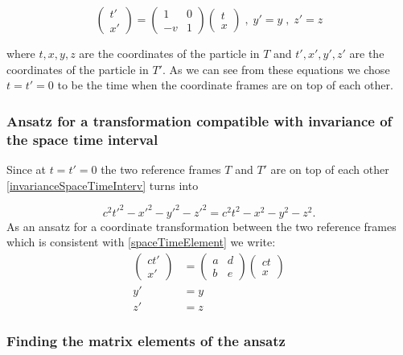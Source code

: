 \documentclass{article}
\begin{document}
\begin{equation} \label{Galilei}
\left(\begin{array}{c}
t'
\\
x'
\end{array} \right)
=
\begin{pmatrix}
1 & 0
\\
-v & 1
\end{pmatrix}
\left(\begin{array}{c}
t
\\
x
\end{array} \right)
\;,\; y'=y \;,\; z'=z
\end{equation}

where $t,x,y,z$ are the coordinates of the particle in $T$ and $t',x',y',z'$ are the coordinates of the particle in $T'$.
As we can see from these equations we chose $t=t'=0$ to be the time when the coordinate frames are on top of each other.

\subsubsection{Ansatz for a transformation compatible with invariance of the space time interval}

Since at $t=t'=0$ the two reference frames $T$ and $T'$ are on top of each other \ref{invarianceSpaceTimeInterv} turns into

\begin{equation} \label{spaceTimeElement}
c^2t'^2-x'^2-y'^2-z'^2 = c^2t^2-x^2-y^2-z^2.
\end{equation}
As an ansatz for a coordinate transformation between the two reference frames which is consistent with \ref{spaceTimeElement} we write:
\begin{align} \label{ansatz}
\left(\begin{array}{c}
ct'
\\
x'
\end{array} \right)
&=
\begin{pmatrix}
a & d
\\
b & e
\end{pmatrix}
\left(\begin{array}{c}
ct
\\
x
\end{array} \right) \\
y' &= y \nonumber \\
z' &= z \nonumber
\end{align}


\subsubsection{Finding the matrix elements of the ansatz}
\end{document}
